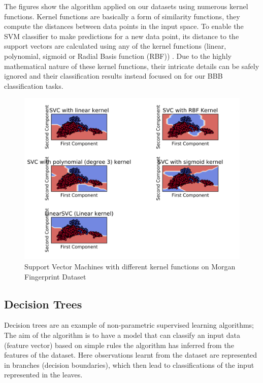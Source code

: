 \documentclass[a4paper,12pt]{report}
\begin{document}
		The figures show the algorithm applied on our datasets using numerous kernel functions. Kernel functions are basically a form of similarity functions, they compute the distances between data points in the input space. To enable the SVM classifier to make predictions for a new data point, its distance to the support vectors are calculated using any of the kernel functions (linear, polynomial, sigmoid or Radial Basis function (RBF)) \cite{StephenM2014}. Due to the highly mathematical nature of these kernel functions, their intricate details can be safely ignored and their classification results instead focused on for our BBB classification tasks. 
		
		\begin{figure}[H]
			\centering
			\includegraphics[width=\textwidth,scale=1,totalheight=0.4\textheight]{images/fps_decision_svm}
			\caption{Support Vector Machines with different kernel functions on Morgan Fingerprint Dataset}
			\label{fig:svm_fps}
		\end{figure}
		
		
		
		
		\subsection{Decision Trees}
			Decision trees are an example of non-parametric supervised learning algorithms; The aim of the algorithm is to have a model that can classify an input data (feature vector) based on simple rules the algorithm has inferred from the features of the dataset. Here observations learnt from the dataset are represented in branches (decision boundaries), which then lead to classifications of the input represented in the leaves. 
			
\end{document}
